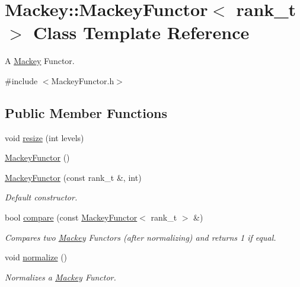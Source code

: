 \hypertarget{classMackey_1_1MackeyFunctor}{}\section{Mackey\+:\+:Mackey\+Functor$<$ rank\+\_\+t $>$ Class Template Reference}
\label{classMackey_1_1MackeyFunctor}


A \hyperlink{namespaceMackey}{Mackey} Functor.  




{\ttfamily \#include $<$Mackey\+Functor.\+h$>$}

\subsection*{Public Member Functions}
\begin{DoxyCompactItemize}
\item 
void \hyperlink{classMackey_1_1MackeyFunctor_a44d3104a47f23de5d8141b7800db6d11}{resize} (int levels)
\item 
\hyperlink{classMackey_1_1MackeyFunctor_a075cd364217700d5f5c2459d4a988a93}{Mackey\+Functor} ()
\item 
\hyperlink{classMackey_1_1MackeyFunctor_a7cdc1be794a7b39e7d4b86c2ad26355e}{Mackey\+Functor} (const rank\+\_\+t \&, int)
\begin{DoxyCompactList}\small\item\em Default constructor. \end{DoxyCompactList}\item 
bool \hyperlink{classMackey_1_1MackeyFunctor_a334a91a445ac86cc5cce53b29efd6df1}{compare} (const \hyperlink{classMackey_1_1MackeyFunctor}{Mackey\+Functor}$<$ rank\+\_\+t $>$ \&)
\begin{DoxyCompactList}\small\item\em Compares two \hyperlink{namespaceMackey}{Mackey} Functors (after normalizing) and returns 1 if equal. \end{DoxyCompactList}\item 
void \hyperlink{classMackey_1_1MackeyFunctor_ae63fdf151f6ee653d6cb50d442948e30}{normalize} ()
\begin{DoxyCompactList}\small\item\em Normalizes a \hyperlink{namespaceMackey}{Mackey} Functor. \end{DoxyCompactList}\end{DoxyCompactItemize}
